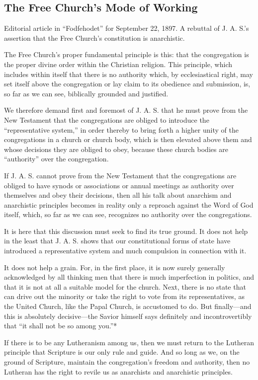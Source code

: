 
\subsection{The Free Church’s Mode of Working}

Editorial article in “Fodfehodet” for September 22, 1897.
A rebuttal of J. A. S.’s assertion that the Free Church’s constitution is anarchistic.

The Free Church’s proper fundamental principle is this: that the congregation is the proper divine order within the Christian religion. This principle, which includes within itself that there is no authority which, by ecclesiastical right, may set itself above the congregation or lay claim to its obedience and submission, is, so far as we can see, biblically grounded and justified.

We therefore demand first and foremost of J. A. S. that he must prove from the New Testament that the congregations are obliged to introduce the “representative system,” in order thereby to bring forth a higher unity of the congregations in a church or church body, which is then elevated above them and whose decisions they are obliged to obey, because these church bodies are “authority” over the congregation.

If J. A. S. cannot prove from the New Testament that the congregations are obliged to have synods or associations or annual meetings as authority over themselves and obey their decisions, then all his talk about anarchism and anarchistic principles becomes in reality only a reproach against the Word of God itself, which, so far as we can see, recognizes no authority over the congregations.

It is here that this discussion must seek to find its true ground. It does not help in the least that J. A. S. shows that our constitutional forms of state have introduced a representative system and much compulsion in connection with it.

It does not help a grain. For, in the first place, it is now surely generally acknowledged by all thinking men that there is much imperfection in politics, and that it is not at all a suitable model for the church. Next, there is no state that can drive out the minority or take the right to vote from its representatives, as the United Church, like the Papal Church, is accustomed to do. But finally—and this is absolutely decisive—the Savior himself says definitely and incontrovertibly that “it shall not be so among you.”*

If there is to be any Lutheranism among us, then we must return to the Lutheran principle that Scripture is our only rule and guide. And so long as we, on the ground of Scripture, maintain the congregation’s freedom and authority, then no Lutheran has the right to revile us as anarchists and anarchistic principles.

